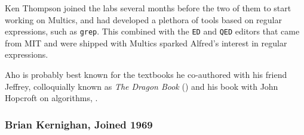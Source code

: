 Ken Thompson joined the labs several months before the two of them to
start working on Multics, and had developed a plethora of tools based on
regular expressions, such as \texttt{grep}.
This combined with the \texttt{ED} and \texttt{QED} editors that came from MIT
and were shipped with Multics sparked Alfred's interest in regular expressions.

Aho is probably best known for the textbooks he co-authored with his friend Jeffrey,
colloquially known as \textit{The Dragon Book} ()
and his book with John Hopcroft on algorithms, .

\subsubsection{Brian Kernighan, Joined 1969}
